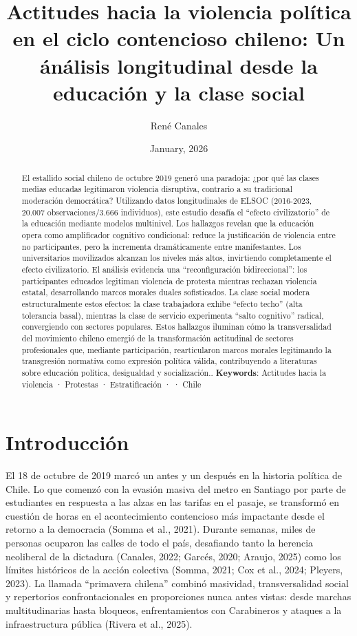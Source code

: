 \documentclass[
  13pt,
]{article}
\title{Actitudes hacia la violencia política en el ciclo contencioso
chileno: Un ánálisis longitudinal desde la educación y la clase social}
\author{René Canales}
\affil{%
                  Instituto de Sociología, Pontificia Universidad
                  Católica de Chile
              }
\date{January, 2026}
\begin{document}
\maketitle
\begin{abstract}
El estallido social chileno de octubre 2019 generó una paradoja: ¿por
qué las clases medias educadas legitimaron violencia disruptiva,
contrario a su tradicional moderación democrática? Utilizando datos
longitudinales de ELSOC (2016-2023, 20.007 observaciones/3.666
individuos), este estudio desafía el ``efecto civilizatorio'' de la
educación mediante modelos multinivel. Los hallazgos revelan que la
educación opera como amplificador cognitivo condicional: reduce la
justificación de violencia entre no participantes, pero la incrementa
dramáticamente entre manifestantes. Los universitarios movilizados
alcanzan los niveles más altos, invirtiendo completamente el efecto
civilizatorio. El análisis evidencia una ``reconfiguración
bidireccional'': los participantes educados legitiman violencia de
protesta mientras rechazan violencia estatal, desarrollando marcos
morales duales sofisticados. La clase social modera estructuralmente
estos efectos: la clase trabajadora exhibe ``efecto techo'' (alta
tolerancia basal), mientras la clase de servicio experimenta ``salto
cognitivo'' radical, convergiendo con sectores populares. Estos
hallazgos iluminan cómo la transversalidad del movimiento chileno
emergió de la transformación actitudinal de sectores profesionales que,
mediante participación, rearticularon marcos morales legitimando la
transgresión normativa como expresión política válida, contribuyendo a
literaturas sobre educación política, desigualdad y socialización..
\newline \textbf{Keywords}: Actitudes hacia la violencia · Protestas ·
Estratificación · · Chile
\end{abstract}


\section{Introducción}\label{introducciuxf3n}

El 18 de octubre de 2019 marcó un antes y un después en la historia
política de Chile. Lo que comenzó con la evasión masiva del metro en
Santiago por parte de estudiantes en respuesta a las alzas en las
tarifas en el pasaje, se transformó en cuestión de horas en el
acontecimiento contencioso más impactante desde el retorno a la
democracia (Somma et al., 2021). Durante semanas, miles de personas
ocuparon las calles de todo el país, desafiando tanto la herencia
neoliberal de la dictadura (Canales, 2022; Garcés, 2020; Araujo, 2025)
como los límites históricos de la acción colectiva (Somma, 2021; Cox et
al., 2024; Pleyers, 2023). La llamada ``primavera chilena'' combinó
masividad, transversalidad social y repertorios confrontacionales en
proporciones nunca antes vistas: desde marchas multitudinarias hasta
bloqueos, enfrentamientos con Carabineros y ataques a la infraestructura
pública (Rivera et al., 2025).
\end{document}
